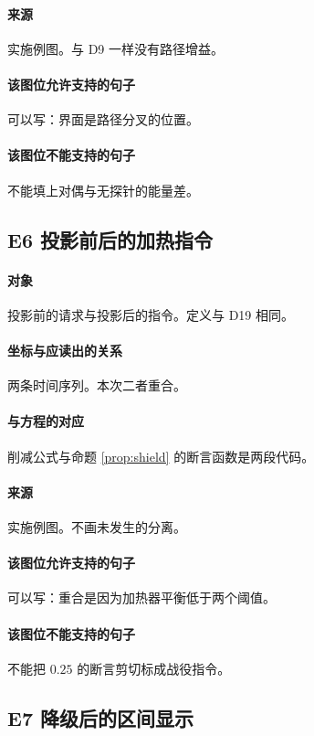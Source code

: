 \paragraph{来源}
实施例图。与 D9 一样没有路径增益。

\paragraph{该图位允许支持的句子}
可以写：界面是路径分叉的位置。

\paragraph{该图位不能支持的句子}
不能填上对偶与无探针的能量差。

\subsection{E6 投影前后的加热指令}
\paragraph{对象}
投影前的请求与投影后的指令。定义与 D19 相同。

\paragraph{坐标与应读出的关系}
两条时间序列。本次二者重合。

\paragraph{与方程的对应}
削减公式与命题 \ref{prop:shield} 的断言函数是两段代码。

\paragraph{来源}
实施例图。不画未发生的分离。

\paragraph{该图位允许支持的句子}
可以写：重合是因为加热器平衡低于两个阈值。

\paragraph{该图位不能支持的句子}
不能把 $0.25$ 的断言剪切标成战役指令。

\subsection{E7 降级后的区间显示}
